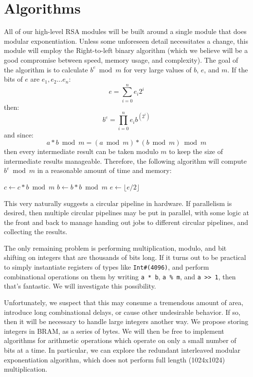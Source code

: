 \documentclass[12pt]{article}
\begin{document}
\section{Algorithms}
All of our high-level RSA modules will be built around a single module that does modular exponentiation.
Unless some unforeseen detail necessitates a change, this module will employ the Right-to-left binary algorithm
(which we believe will be a good compromise between speed, memory usage, and complexity).
The goal of the algorithm is to calculate $b^e \bmod m$ for very large values of $b$, $e$, and $m$.
If the bits of $e$ are $e_1, e_2 \dots e_n$:
\begin{equation}
e = \sum_{i = 0}^{n} e_i 2^i
\end{equation}
then:
\begin{equation}
b^e = \prod_{i = 0}^{n} e_i b^{(2^i)}
\end{equation}
and since:
\begin{equation}
a * b \bmod m = (a \bmod m) * (b \bmod m) \bmod m
\end{equation}
then every intermediate result can be taken modulo $m$ to keep the size of intermediate results manageable.
Therefore, the following algorithm will compute $b^e \bmod m$ in a reasonable amount of time and memory:
\begin{algorithmic}
		\State $c \gets c * b \bmod m$
	\EndIf
	\State $b \gets b * b \bmod m$
	\State $e \gets \lfloor e / 2 \rfloor$
\EndWhile
\end{algorithmic}
This very naturally suggests a circular pipeline in hardware.
If parallelism is desired, then multiple circular pipelines may be put in parallel,
with some logic at the front and back to manage handing out jobs to different circular pipelines,
and collecting the results.

The only remaining problem is performing multiplication, modulo, and bit shifting
on integers that are thousands of bits long.
If it turns out to be practical to simply instantiate registers of types like {\tt Int\#(4096)},
and perform combinational operations on them by writing {\tt a~*~b}, {\tt a~\%~m}, and {\tt a~>>~1},
then that's fantastic.
We will investigate this possibility.

Unfortunately, we suspect that this may consume a tremendous amount of area,
introduce long combinational delays, or cause other undesirable behavior.
If so, then it will be necessary to handle large integers another way.
We propose storing integers in BRAM, as a series of bytes.
We will then be free to implement algorithms for arithmetic operations
which operate on only a small number of bits at a time. In particular, we can 
explore the redundant interleaved modular exponentiation algorithm, which does
not perform full length (1024x1024) multiplication. 
\end{document}
